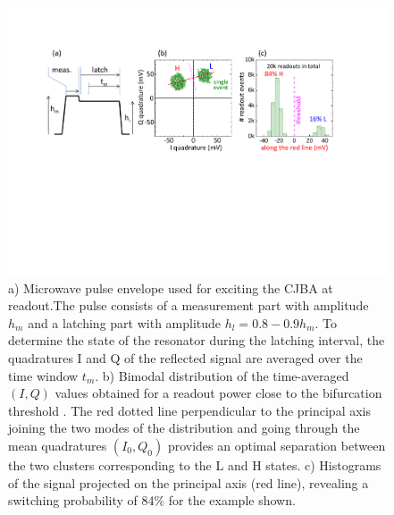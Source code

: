 \begin{figure}[ht!]
\centering
\includegraphics[width=\textwidth]{./material/figures/measurement/readout}
\caption[]{a) Microwave pulse envelope used for exciting the CJBA at readout.The pulse consists of a measurement part with amplitude $h_m$ and a latching part with amplitude $h_l=0.8-0.9h_m$. To determine the state of the resonator during the latching interval, the quadratures I and Q of the reflected signal are averaged over the time window $t_m$. b) Bimodal distribution of the time-averaged $(I,Q)$ values obtained for a readout power close to the bifurcation threshold . The red dotted line perpendicular to the principal axis joining the two modes of the distribution and going through the mean quadratures $(I_0,Q_0)$ provides an optimal separation between the two clusters corresponding to the L and H states. c) Histograms of the signal projected on the principal axis (red line), revealing a switching probability of 84\% for the  example shown.}
\label{fig:readout_bringup}
\end{figure}

